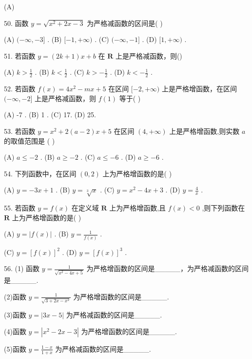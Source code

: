\documentclass[10pt]{article}
\begin{document}
(A)

50. 函数 \(y = \sqrt{{x}^{2} + {2x} - 3}\) 为严格减函数的区间是( )

(A) \(( - \infty , - 3\rbrack\) . (B) \(\lbrack  - 1, + \infty )\) . (C) \(( - \infty , - 1\rbrack\) . (D) \(\lbrack 1, + \infty )\) .

51. 若函数 \(y = \left( {{2k} + 1}\right) x + b\) 在 \(\mathbf{R}\) 上是严格减函数，则()

(A) \(k > \frac{1}{2}\) . (B) \(k < \frac{1}{2}\) . (C) \(k >  - \frac{1}{2}\) . (D) \(k <  - \frac{1}{2}\) .

52. 若函数 \(f\left( x\right)  = 4{x}^{2} - {mx} + 5\) 在区间 \(\lbrack  - 2, + \infty )\) 上是严格增函数，在区间 \(( - \infty , - 2\rbrack\) 上是严格减函数，则 \(f\left( 1\right)\) 等于( )

(A) -7 . (B) 1 . (C) 17. (D) 25.

53. 若函数 \(y = {x}^{2} + 2\left( {a - 2}\right) x + 5\) 在区间 \(\left( {4, + \infty }\right)\) 上是严格增函数,则实数 \(a\) 的取值范围是 ( )

(A) \(a \leq   - 2\) . (B) \(a \geq   - 2\) . (C) \(a \leq   - 6\) . (D) \(a \geq   - 6\) .

54. 下列函数中，在区间 \(\left( {0,2}\right)\) 上为严格增函数的是( )

(A) \(y =  - {3x} + 1\) . (B) \(y = \sqrt[3]{x}\) . (C) \(y = {x}^{2} - {4x} + 3\) . (D) \(y = \frac{4}{x}\) .

55. 若函数 \(y = f\left( x\right)\) 在定义域 \(\mathbf{R}\) 上为严格增函数,且 \(f\left( x\right)  < 0\) ,则下列函数在 \(\mathbf{R}\) 上为严格增函数的是( )

(A) \(y = \left| {f\left( x\right) }\right|\) . (B) \(y = \frac{1}{f\left( x\right) }\) .

(C) \(y = {\left\lbrack  f\left( x\right) \right\rbrack  }^{2}\) . (D) \(y = {\left\lbrack  f\left( x\right) \right\rbrack  }^{3}\) .

56. (1) 函数 \(y = \frac{1}{\sqrt{{x}^{2} - {4x} + 5}}\) 为严格增函数的区间是\_\_\_\_\_，为严格减函数的区间是\_\_\_\_\_.

(2)函数 \(y = \frac{1}{\sqrt{3 + {2x} - {x}^{2}}}\) 为严格增函数的区间是\_\_\_\_\_.

(3)函数 \(y = \left| {{3x} - 5}\right|\) 为严格减函数的区间是\_\_\_\_\_.

(4)函数 \(y = \left| {{x}^{2} - {2x} - 3}\right|\) 为严格增函数的区间是\_\_\_\_\_.

(5)函数 \(y = \frac{1 - x}{1 + x}\) 为严格减函数的区间是\_\_\_\_\_.
\end{document}
